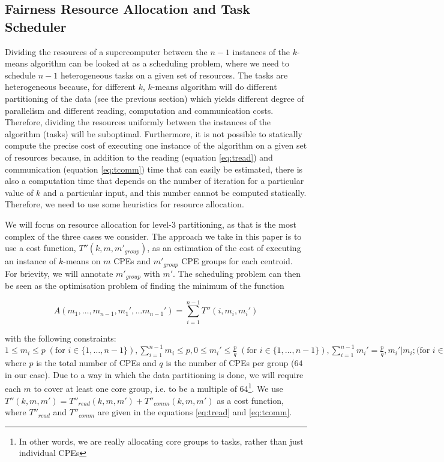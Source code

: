 \documentclass[10pt,journal,compsoc]{IEEEtran}
\begin{document}
\subsection{Fairness Resource Allocation and Task Scheduler}
Dividing the resources of a supercomputer between the $n-1$
instances of the $k$-means algorithm can be looked at as a scheduling
problem, where we need to schedule $n-1$ heterogeneous tasks on a
given set of resources. The tasks are heterogeneous because, for
different $k$, $k$-means algorithm will do different partitioning of
the data (see the previous section) which yields different degree of
parallelism and different reading, computation and communication
costs. Therefore, dividing the resources uniformly
between the instances of the algorithm (tasks) will be suboptimal.
Furthermore, it is not possible to statically
compute the precise cost of executing one instance of the algorithm on
a given set of resources because, in addition to the reading (equation
\ref{eq:tread}) and communication (equation \ref{eq:tcomm}) time that
can easily be estimated, there is also a computation time that depends
on the number of iteration for a particular value of $k$ and a
particular input, and this number cannot be computed
statically. Therefore, we need to use some heuristics for resource
allocation.

We will focus on resource allocation for level-3 partitioning, as that
is the most complex of the three cases we consider.
The approach we take in this paper is to use a cost function,
$T''(k,m,m'_{group})$, as an estimation of the cost of executing an
instance of $k$-means on $m$ CPEs and $m'_{group}$ CPE groups for each
centroid. For brievity, we will annotate $m'_{group}$ with $m'$.
The scheduling problem can then be seen as the optimisation
problem of finding the minimum of the function

$$A(m_1,\dots,m_{n-1}, m_1', \dots
m_{n-1}') = \sum_{i=1}^{n-1} T''(i,m_i,m_i')$$

\noindent
with the following constraints: $1 \leq m_i \leq p \; (\mbox{for } i \in
\{1,\dots,n-1\}), \sum_{i=1}^{n-1} m_i \leq p, 0 \leq m_i' \leq
\frac{p}{q} \; (\mbox{for } i \in
\{1,\dots,n-1\}), \sum_{i=1}^{n-1} m_i' = \frac{p}{q}, m_i' | m_i;
(\mbox{for } i \in \{1,\dots,n-1\}$
where $p$ is the total number of CPEs and $q$ is the number of CPEs
per group ($64$ in our case). Due to a way in which the data
partitioning is done, we will require each $m$ to cover at least one
core group, i.e. to be a multiple of 64\footnote{In other words, we
  are really allocating core groups to tasks, rather than just
  individual CPEs}. We use $T''(k,m,m')=T''_{read}(k,m,m')+T''_{comm}(k,m,m')$ as a 
cost function, where $T''_{read}$ and $T''_{comm}$ are given in the equations
\ref{eq:tread} and \ref{eq:tcomm}. %
\end{document}
